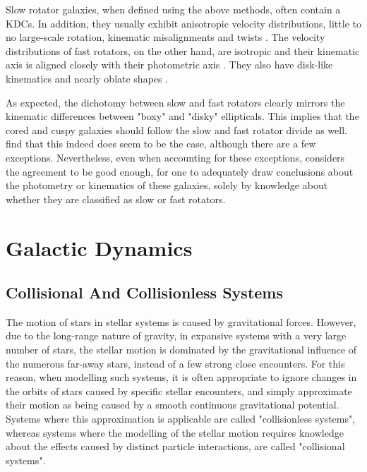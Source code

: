 \documentclass[english, twoside]{HYgradu}
\begin{document}
Slow rotator galaxies, when defined using the above methods, often contain a KDCs. In addition, they usually exhibit anisotropic velocity distributions, little to no large-scale rotation, kinematic misalignments and twists \citep{Emsellem2007, Cappellari2007}. The velocity distributions of fast rotators, on the other hand, are isotropic and their kinematic axis is aligned closely with their photometric axis \citep{Emsellem2007}. They also have disk-like kinematics and nearly oblate shapes \citep{Cappellari2007}. 

As expected, the dichotomy between slow and fast rotators clearly mirrors the kinematic differences between "boxy" and "disky" ellipticals. This implies that the cored and cuspy galaxies should follow the slow and fast rotator divide as well. \cite{Krajnovic2013} find that this indeed does seem to be the case, although there are a few exceptions. Nevertheless, even when accounting for these exceptions, \cite{Cappellari2016} considers the agreement to be good enough, for one to adequately draw conclusions about the photometry or kinematics of these galaxies, solely by knowledge about whether they are classified as slow or fast rotators.

\section{Galactic Dynamics}

\subsection{Collisional And Collisionless Systems} \label{section:collisionless}

The motion of stars in stellar systems is caused by gravitational forces. However, due to the long-range nature of gravity, in expansive systems with a very large number of stars, the stellar motion is dominated by the gravitational influence of the numerous far-away stars, instead of a few strong close encounters. For this reason, when modelling such systems, it is often appropriate to ignore changes in the orbits of stars caused by specific stellar encounters, and simply approximate their motion as being caused by a smooth continuous gravitational potential. Systems where this approximation is applicable are called "collisionless systems", whereas systems where the modelling of the stellar motion requires knowledge about the effects caused by distinct particle interactions, are called "collisional systems".
\end{document}
